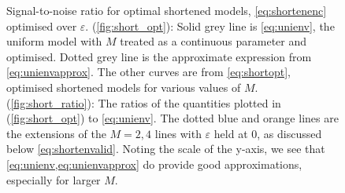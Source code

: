 \documentclass[12pt]{article}
\begin{document}
\begin{figure}[ht]
\begin{center}
\begin{myenuma}
  \item\label{fig:short_opt}
  \item\label{fig:short_ratio}
\end{myenuma}
\caption[Signal-to-noise ratio for optimal shortened models]
{Signal-to-noise ratio for optimal shortened models, \cref{eq:shortenenc} optimised over \(\varepsilon\).
(\ref{fig:short_opt}): Solid grey line is \cref{eq:unienv}, the uniform model with \(M\) treated as a continuous parameter and optimised.
Dotted grey line is the approximate expression from \cref{eq:unienvapprox}.
The other curves are from \cref{eq:shortopt}, optimised shortened models for various values of \(M\).
(\ref{fig:short_ratio}): The ratios of the quantities plotted in (\ref{fig:short_opt}) to \cref{eq:unienv}.
The dotted blue and orange lines are the extensions of the \(M=2,4\) lines with \(\varepsilon\) held at 0, as discussed below \cref{eq:shortenvalid}.
Noting the scale of the y-axis, we see that \cref{eq:unienv,eq:unienvapprox} do provide good approximations, especially for larger \(M\).
\label{fig:shorten}}
\end{center}
\end{figure}
\end{document}
